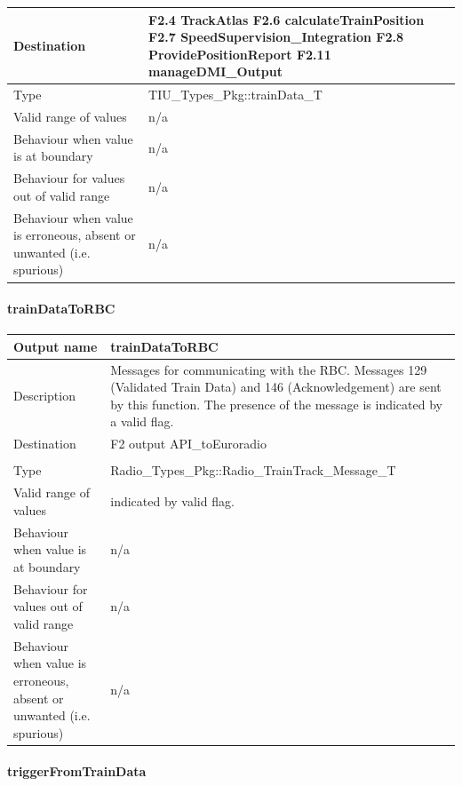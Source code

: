 \begin{longtable}{p{}p{}}
\midrule
Destination				& F2.4 TrackAtlas\newline
F2.6 calculateTrainPosition\newline
F2.7 SpeedSupervision\_Integration\newline
F2.8 ProvidePositionReport\newline
F2.11 manageDMI\_Output 
\\ 
\midrule
Type						& TIU\_Types\_Pkg::trainData\_T \\
\midrule
Valid range of values			& n/a \\
\midrule
Behaviour when value is at boundary	& n/a \\
\midrule
Behaviour for values out of valid range	& n/a \\
\midrule
Behaviour when value is erroneous, absent or unwanted (i.e. spurious) &n/a \\
\bottomrule
\end{longtable}

\paragraph{trainDataToRBC}

\begin{longtable}{p{}p{}}
\toprule
Output name				& trainDataToRBC \\
\midrule
Description				& Messages for communicating with the RBC. Messages 129 (Validated Train Data) and 146 (Acknowledgement) are sent by this function. The presence of the message is indicated by a valid flag.\\
\midrule
Destination				& F2 output API\_toEuroradio\\ 
\\ 
\midrule
Type					& Radio\_Types\_Pkg::Radio\_TrainTrack\_Message\_T \\
\midrule
Valid range of values	& indicated by valid flag. \\
\midrule
Behaviour when value is at boundary	& n/a\\
\midrule
Behaviour for values out of valid range	& n/a \\
\midrule
Behaviour when value is erroneous, absent or unwanted (i.e. spurious) & n/a\\
\bottomrule
\end{longtable}

\paragraph{triggerFromTrainData}

